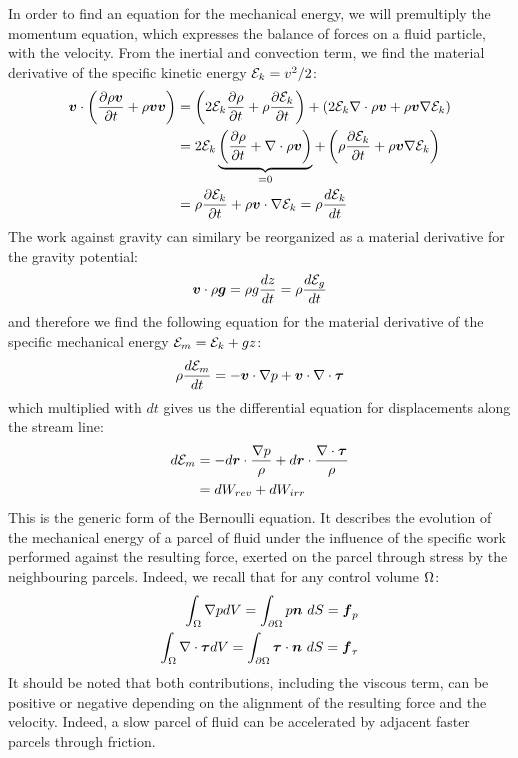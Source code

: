 In order to find an equation for the mechanical energy, we will
premultiply the momentum equation, which expresses the balance of
forces on a fluid particle, with the velocity. From the inertial and
convection term, we find the material derivative of the specific
kinetic energy $\mathcal E_k = v^2/2$:
\begin{align*}
  \boldsymbol {v} \cdot \left(\frac{\partial \rho \boldsymbol {v}}{\partial t} + \rho \boldsymbol {v} \boldsymbol {v} \right)
  &= 
  \left(2 \mathcal E_k \frac{\partial \rho}{\partial t} + \rho \frac{\partial \mathcal E_k}{\partial t}  \right) + 
  \left(2 \mathcal E_k \nabla \cdot \rho \boldsymbol {v} + \rho \boldsymbol {v} \nabla \mathcal E_k \right) \\
  &= 
  2 \mathcal E_k \underbrace{\left(\frac{\partial \rho}{\partial t} + \nabla \cdot \rho \boldsymbol {v} \right)}_{=0} + 
  \left( \rho \frac{\partial \mathcal E_k}{\partial t} + \rho \boldsymbol {v} \nabla \mathcal E_k\right)\\
  &= 
  \rho \frac{\partial \mathcal E_k}{\partial t} + \rho \boldsymbol {v} \cdot \nabla \mathcal E_k = \rho \frac{d\mathcal E_k}{dt} \\
\end{align*}
The work against gravity can similary be reorganized as a material
derivative for the gravity potential:
\begin{align*}
  \boldsymbol {v} \cdot \rho \boldsymbol {g} = \rho g \frac{dz}{dt}  = \rho \frac{d\mathcal E_g}{dt}
\end{align*}
and therefore we find the following equation for the material
derivative of the specific mechanical energy $\mathcal E_m = \mathcal E_k + g
z$:
\begin{equation}
  \rho \frac{d\mathcal E_m}{dt} = - \boldsymbol {v} \cdot \nabla p +\boldsymbol {v} \cdot \nabla \cdot \boldsymbol {\tau}
  \label{eq:bernoulli}
\end{equation}
which multiplied with $dt$ gives us the differential equation for displacements along
the stream line:
\begin{equation}
  \begin{split}
    d \mathcal E_m &= - 
    d\boldsymbol {r} \cdot \frac{\nabla p}{\rho} + 
    d\boldsymbol {r} \cdot \frac{\nabla \cdot \boldsymbol {\tau}}{\rho} \\
    &= dW_{rev} + dW_{irr} 
  \end{split}
  \label{eq:bernoulli2}
\end{equation}
This is the generic form of the Bernoulli equation. It describes the
evolution of the mechanical energy of a parcel of fluid under the
influence of the specific work performed against the resulting force,
exerted on the parcel through stress by the neighbouring
parcels. Indeed, we recall that for any control volume $\Omega$:
\begin{align*}
  \int_{\Omega} \nabla p dV = \int_{{\partial \Omega}} p \boldsymbol {n} ~dS = \boldsymbol {f}_p \\
  \int_{\Omega} \nabla \cdot \boldsymbol {\tau} dV = \int_{{\partial \Omega}} \boldsymbol {\tau} \cdot \boldsymbol {n} ~dS = \boldsymbol {f}_{\tau} 
\end{align*}
It should be noted that both contributions, including the viscous
term, can be positive or negative depending on the alignment of the
resulting force and the velocity. Indeed, a slow parcel of fluid can
be accelerated by adjacent faster parcels through friction.

